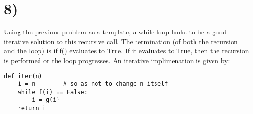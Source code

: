\documentclass[a4paper,11pt]{article}
\begin{document}

\section*{8)}
Using the previous problem as a template, a while loop looks to be a good iterative solution to this recursive call.  The termination
(of both the recursion and the loop) is if f() evaluates to True.  If it evaluates to True, then the recursion is performed or the loop progresses.  An iterative implimenation is given by:
\begin{verbatim}
def iter(n)
    i = n        # so as not to change n itself
    while f(i) == False:
        i = g(i)
    return i
\end{verbatim}

\end{document}
